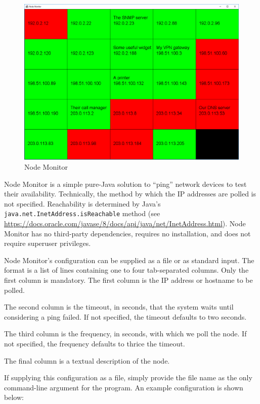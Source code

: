 \documentclass[12pt]{article}
\begin{document}
\begin{figure}[h]
\centering
\includegraphics[width=\textwidth]{Node-Monitor}
\caption{Node Monitor}
\label{fig:Node-Monitor}
\end{figure}

Node Monitor is a simple pure-Java solution to ``ping'' network devices to test their availability. Technically, the method by which the IP addresses are polled is not specified. Reachability is determined by Java's \texttt{java.net.InetAddress.isReachable} method (see \url{https://docs.oracle.com/javase/8/docs/api/java/net/InetAddress.html}). Node Monitor has no third-party dependencies, requires no installation, and does not require superuser privileges.

Node Monitor's configuration can be supplied as a file or as standard input. The format is a list of lines containing one to four tab-separated columns. Only the first column is mandatory. The first column is the IP address or hostname to be polled.

The second column is the timeout, in seconds, that the system waits until considering a ping failed. If not specified, the timeout defaults to two seconds.

The third column is the frequency, in seconds, with which we poll the node. If not specified, the frequency defaults to thrice the timeout.

The final column is a textual description of the node.

If supplying this configuration as a file, simply provide the file name as the only command-line argument for the program. An example configuration is shown below:
\end{document}
